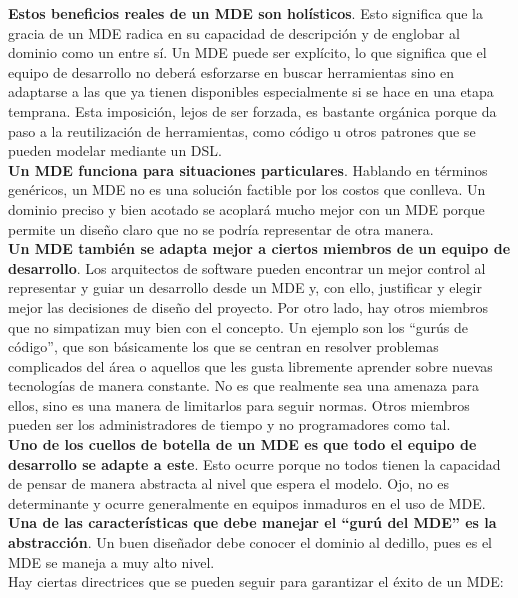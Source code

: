 \textbf{Estos beneficios reales de un MDE son holísticos}.
Esto significa que la gracia de un MDE radica en su
capacidad de descripción y de englobar al dominio como un
entre sí. Un MDE puede ser explícito, lo que significa que
el equipo de desarrollo no deberá esforzarse en buscar
herramientas sino en adaptarse a las que ya tienen
disponibles especialmente si se hace en una etapa temprana.
Esta imposición, lejos de ser forzada, es bastante orgánica
porque da paso a la reutilización de herramientas, como
código u otros patrones que se pueden modelar mediante un
DSL. \\

\textbf{Un MDE funciona para situaciones particulares}.
Hablando en términos genéricos, un MDE no es una
solución factible por los costos que conlleva. Un dominio
preciso y bien acotado se acoplará mucho mejor con un MDE
porque permite un diseño claro que no se podría representar
de otra manera. \\

\textbf{Un MDE también se adapta mejor a ciertos miembros
de un equipo de desarrollo}. Los arquitectos de software
pueden encontrar un mejor control al representar y guiar un
desarrollo desde un MDE y, con ello, justificar y elegir
mejor las decisiones de diseño del proyecto. Por otro lado,
hay otros miembros que no simpatizan muy bien con el
concepto. Un ejemplo son los ``gurús de código'', que son
básicamente los que se centran en resolver problemas
complicados del área o aquellos que les gusta libremente
aprender sobre nuevas tecnologías de manera constante.
No es que realmente sea una amenaza para ellos, sino es una
manera de limitarlos para seguir normas. Otros miembros
pueden ser los administradores de tiempo y no programadores
como tal. \\

\textbf{Uno de los cuellos de botella de un MDE es
que todo el equipo de desarrollo se adapte a este}. Esto
ocurre porque no todos tienen la capacidad de pensar de
manera abstracta al nivel que espera el modelo. Ojo, no es
determinante y ocurre generalmente en equipos inmaduros en
el uso de MDE. \\

\textbf{Una de las características que debe manejar el
``gurú del MDE'' es la abstracción}. Un buen diseñador debe
conocer el dominio al dedillo, pues es el MDE se maneja a
muy alto nivel. \\

Hay ciertas directrices que se pueden seguir para garantizar
el éxito de un MDE:

